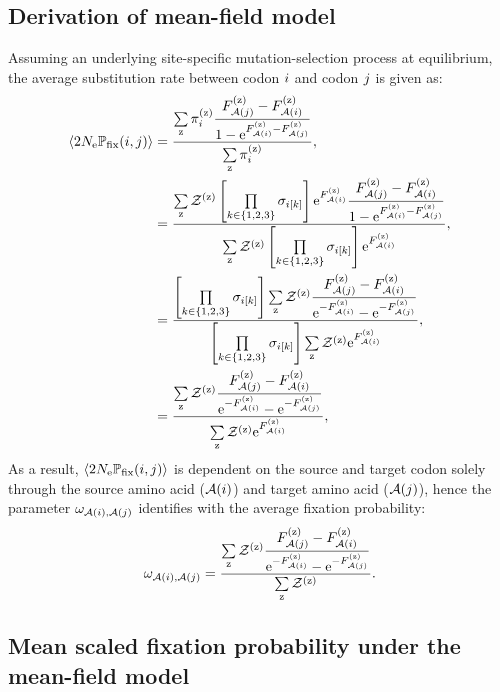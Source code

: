 \subsection{Derivation of mean-field model}
\label{subsec:mean-field-derivation}
Assuming an underlying site-specific mutation-selection process at equilibrium, the average substitution rate between codon ${i}$ and codon ${j}$ is given as:
\begin{align}
    \left\langle 2 N_{\text{e}} \mathbb{P}_{\text{fix}} ({i}, {j}) \right\rangle & = \dfrac{ \sum\limits_{\text{z}} \pi_{{i}}^{(\text{z})} \dfrac{F_{\mathcal{A}({j})}^{(\text{z})} - F_{\mathcal{A}({i})}^{(\text{z})}}{1 - \text{e}^{F_{\mathcal{A}({i})}^{(\text{z})} - F_{\mathcal{A}({j})}^{(\text{z})}}} }{ \sum\limits_{\text{z}} \pi_{{i}}^{(\text{z})} }, \\
    & = \dfrac{ \sum\limits_{\text{z}} \mathcal{Z}^{(\text{z})} \left[\prod\limits_{k \in \{ 1, 2, 3 \}} \sigma_{{i}[k]}\right] \text{e}^{F_{\mathcal{A}({i})}^{(\text{z})}} \dfrac{F_{\mathcal{A}({j})}^{(\text{z})} - F_{\mathcal{A}({i})}^{(\text{z})}}{1 - \text{e}^{F_{\mathcal{A}({i})}^{(\text{z})} - F_{\mathcal{A}({j})}^{(\text{z})}}} }{ \sum\limits_{\text{z}} \mathcal{Z}^{(\text{z})} \left[\prod\limits_{k \in \{ 1, 2, 3 \}} \sigma_{{i}[k]}\right] \text{e}^{F_{\mathcal{A}({i})}^{(\text{z})}} }, \\
    & = \dfrac{ \left[\prod\limits_{k \in \{ 1, 2, 3 \}} \sigma_{{i}[k]}\right] \sum\limits_{\text{z}} \mathcal{Z}^{(\text{z})}  \dfrac{F_{\mathcal{A}({j})}^{(\text{z})} - F_{\mathcal{A}({i})}^{(\text{z})}}{ \text{e}^{-F_{\mathcal{A}({i})}^{(\text{z})}} - \text{e}^{ - F_{\mathcal{A}({j})}^{(\text{z})}}} }{ \left[\prod\limits_{k \in \{ 1, 2, 3 \}} \sigma_{{i}[k]}\right] \sum\limits_{\text{z}} \mathcal{Z}^{(\text{z})} \text{e}^{F_{\mathcal{A}({i})}^{(\text{z})}} }, \\
    & = \dfrac{ \sum\limits_{\text{z}} \mathcal{Z}^{(\text{z})}  \dfrac{F_{\mathcal{A}({j})}^{(\text{z})} - F_{\mathcal{A}({i})}^{(\text{z})}}{ \text{e}^{-F_{\mathcal{A}({i})}^{(\text{z})}} - \text{e}^{ - F_{\mathcal{A}({j})}^{(\text{z})}}} }{  \sum\limits_{\text{z}} \mathcal{Z}^{(\text{z})} \text{e}^{F_{\mathcal{A}({i})}^{(\text{z})}} },
\end{align}
As a result, $\left\langle 2 N_{\text{e}} \mathbb{P}_{\text{fix}} ({i}, {j}) \right\rangle$ is dependent on the source and target codon solely through the source amino acid ($\mathcal{A}({i})$) and target amino acid ($\mathcal{A}({j})$), hence the parameter $\omega_{\mathcal{A}({i}), \mathcal{A}({j})}$ identifies with the average fixation probability:
\begin{equation}
    \omega_{\mathcal{A}({i}), \mathcal{A}({j})} = \dfrac{ \sum\limits_{\text{z}} \mathcal{Z}^{(\text{z})}  \dfrac{F_{\mathcal{A}({j})}^{(\text{z})} - F_{\mathcal{A}({i})}^{(\text{z})}}{ \text{e}^{-F_{\mathcal{A}({i})}^{(\text{z})}} - \text{e}^{ - F_{\mathcal{A}({j})}^{(\text{z})}}} }{  \sum\limits_{\text{z}} \mathcal{Z}^{(\text{z})}  }.
\end{equation}

\subsection{Mean scaled fixation probability under the mean-field model}
\label{sec:mut-bias-mean-field-omega}

